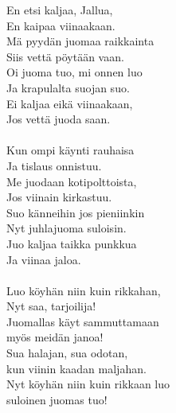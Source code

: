 
En etsi kaljaa, Jallua, \\ En kaipaa viinaakaan. \\ Mä pyydän juomaa raikkainta \\ Siis vettä pöytään vaan. \\ Oi juoma tuo, mi onnen luo \\ Ja krapulalta suojan suo. \\ Ei kaljaa eikä viinaakaan, \\ Jos vettä juoda saan. \\ \hspace{10mm} \\ Kun ompi käynti rauhaisa \\ Ja tislaus onnistuu. \\ Me juodaan kotipolttoista, \\ Jos viinain kirkastuu. \\ Suo känneihin jos pieniinkin \\ Nyt juhlajuoma suloisin. \\ Juo kaljaa taikka punkkua \\ Ja viinaa jaloa. \\ \hspace{10mm} \\ Luo köyhän niin kuin rikkahan, \\ Nyt saa, tarjoilija! \\ Juomallas käyt sammuttamaan \\ myös meidän janoa! \\ Sua halajan, sua odotan, \\ kun viinin kaadan maljahan. \\ Nyt köyhän niin kuin rikkaan luo \\ suloinen juomas tuo!